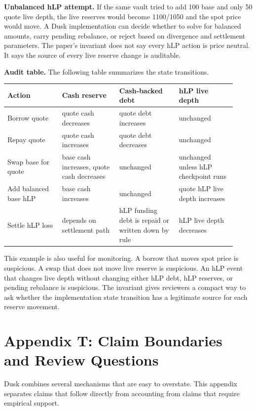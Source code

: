 \documentclass[11pt]{article}
\begin{document}
\textbf{Unbalanced hLP attempt.} If the same vault tried to add 100 base and only 50 quote live depth, the live reserves would become 1100/1050 and the spot price would move. A Dusk implementation can decide whether to solve for balanced amounts, carry pending rebalance, or reject based on divergence and settlement parameters. The paper's invariant does not say every hLP action is price neutral. It says the source of every live reserve change is auditable.

\textbf{Audit table.} The following table summarizes the state transitions.
\begin{center}
\small
\begin{tabular}{@{}p{0.22\linewidth}p{0.23\linewidth}p{0.24\linewidth}p{0.23\linewidth}@{}}
\toprule
Action & Cash reserve & Cash-backed debt & hLP live depth \\
\midrule
Borrow quote & quote cash decreases & quote debt increases & unchanged \\
Repay quote & quote cash increases & quote debt decreases & unchanged \\
Swap base for quote & base cash increases, quote cash decreases & unchanged & unchanged unless hLP checkpoint runs \\
Add balanced base hLP & base cash increases & unchanged & quote hLP live depth increases \\
Settle hLP loss & depends on settlement path & hLP funding debt is repaid or written down by rule & hLP live depth decreases \\
\bottomrule
\end{tabular}
\end{center}

This example is also useful for monitoring. A borrow that moves spot price is suspicious. A swap that does not move live reserve is suspicious. An hLP event that changes live depth without changing either hLP debt, hLP reserves, or pending rebalance is suspicious. The invariant gives reviewers a compact way to ask whether the implementation state transition has a legitimate source for each reserve movement.

\section{Appendix T: Claim Boundaries and Review Questions}

Dusk combines several mechanisms that are easy to overstate. This appendix separates claims that follow directly from accounting from claims that require empirical support.
\end{document}
